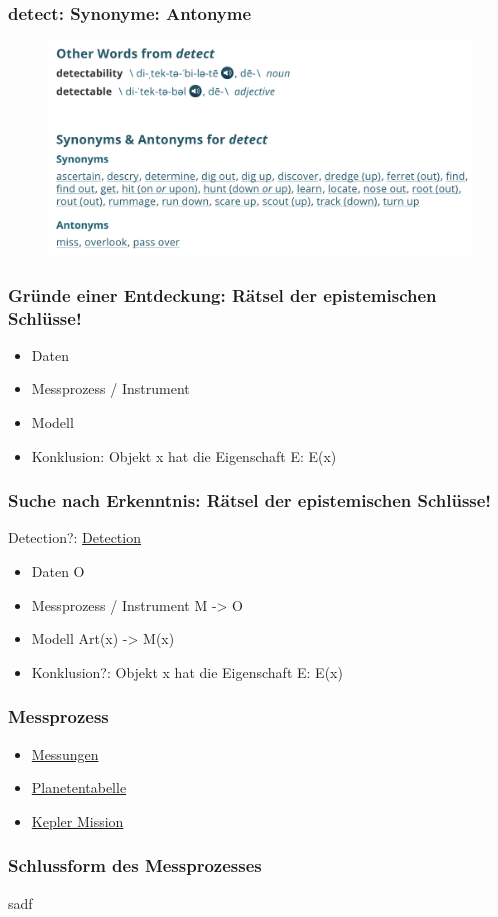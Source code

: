 \documentclass[11pt]{beamer}
\begin{document}
	\begin{frame}
	\frametitle{detect: Synonyme: Antonyme}
\begin{figure}
	\centering
	\includegraphics[width=0.7\linewidth]{screenshot002}
	\caption{}
	\label{fig:screenshot002}
\end{figure}
\end{frame}


	\begin{frame}
	\frametitle{Gründe einer Entdeckung: Rätsel der epistemischen Schlüsse!}
	\begin{itemize}
		\item Daten
		\item Messprozess / Instrument
		\item Modell
		\item Konklusion: Objekt x hat die Eigenschaft E: E(x)
	\end{itemize}
\end{frame}

	\begin{frame}
	\frametitle{Suche nach Erkenntnis: Rätsel der epistemischen Schlüsse!}
	Detection?: \href{https://iopscience.iop.org/article/10.3847/2041-8213/ab0e8d}{Detection}
	\begin{itemize}
		\item Daten O
		\item Messprozess / Instrument M -> O
		\item Modell Art(x) -> M(x)
		\item Konklusion?: Objekt x hat die Eigenschaft E: E(x)
	\end{itemize}
\end{frame}


\begin{frame}
	\frametitle{Messprozess}

	\begin{itemize}
		\item\href{https://exoplanets.nasa.gov/5-ways-to-find-a-planet/}{Messungen}
		\item\href{https://exoplanetarchive.ipac.caltech.edu/cgi-bin/TblView/nph-tblView?app=ExoTbls&config=planets}{Planetentabelle}
		\item\href{https://www.nasa.gov/mission_pages/kepler/overview/index.html}{Kepler Mission}
	\end{itemize}
\end{frame}

\begin{frame}
	\frametitle{Schlussform des Messprozesses}

	\begin{itemize}
	\end{itemize}
\end{frame}
sadf
\end{document}
